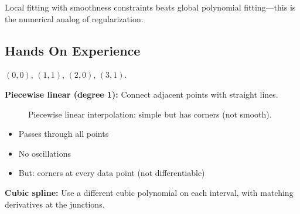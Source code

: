  Local fitting with smoothness constraints beats global polynomial fitting---this is the numerical analog of regularization.



\newpage
\subsection{Hands On Experience}

 $(0, 0)$, $(1, 1)$, $(2, 0)$, $(3, 1)$.

\vspace{1em}
\textbf{Piecewise linear (degree 1):} Connect adjacent points with straight lines.

\begin{figure}[h]
    \centering
    \caption{Piecewise linear interpolation: simple but has corners (not smooth).}
    \label{fig:piecewise_linear}
\end{figure}

\begin{itemize}
    \item Passes through all points \checkmark
    \item No oscillations \checkmark
    \item But: corners at every data point (not differentiable) 
\end{itemize}


\vspace{1em}
\textbf{Cubic spline:} Use a different cubic polynomial on each interval, with matching derivatives at the junctions.

